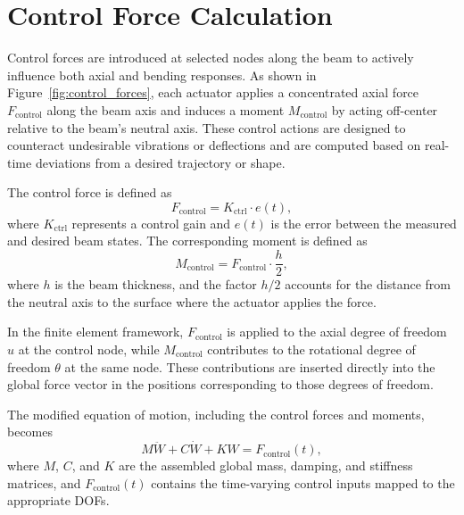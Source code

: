 \documentclass{article}
\begin{document}
	
	
	
	
	
	
	
	
	\section*{Control Force Calculation}
	Control forces are introduced at selected nodes along the beam to actively influence both axial and bending responses. As shown in Figure~\ref{fig:control_forces}, each actuator applies a concentrated axial force \( F_{\text{control}} \) along the beam axis and induces a moment \( M_{\text{control}} \) by acting off-center relative to the beam’s neutral axis. These control actions are designed to counteract undesirable vibrations or deflections and are computed based on real-time deviations from a desired trajectory or shape.
	
	The control force is defined as
	\begin{equation}
		F_{\text{control}} = K_{\text{ctrl}} \cdot e(t),
	\end{equation}
	where \( K_{\text{ctrl}} \) represents a control gain and \( e(t) \) is the error between the measured and desired beam states. The corresponding moment is defined as
	\begin{equation}
		M_{\text{control}} = F_{\text{control}} \cdot \frac{h}{2},
	\end{equation}
	where \( h \) is the beam thickness, and the factor \( h/2 \) accounts for the distance from the neutral axis to the surface where the actuator applies the force.
	
	In the finite element framework, \( F_{\text{control}} \) is applied to the axial degree of freedom \( u \) at the control node, while \( M_{\text{control}} \) contributes to the rotational degree of freedom \( \theta \) at the same node. These contributions are inserted directly into the global force vector in the positions corresponding to those degrees of freedom.
	
	The modified equation of motion, including the control forces and moments, becomes
	\begin{equation}
		M \ddot{W} + C \dot{W} + K W = F_{\text{control}}(t),
	\end{equation}
	where \( M \), \( C \), and \( K \) are the assembled global mass, damping, and stiffness matrices, and \( F_{\text{control}}(t) \) contains the time-varying control inputs mapped to the appropriate DOFs.
	
\end{document}
